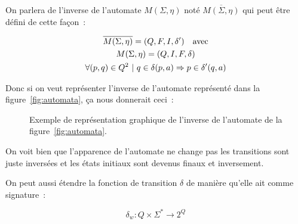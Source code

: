 \documentclass[12pt]{article}
\begin{document}
\vphantom{}

On parlera de l'inverse de l'automate \(M(\Sigma, \eta)\) noté
\(\overline{M(\Sigma, \eta)}\) qui peut être défini de cette façon~:

\begin{gather}
    \overline{M(\Sigma, \eta)} = (Q, F, I, \delta') \quad \text{avec} \\
    M(\Sigma, \eta) = (Q, I, F, \delta) \notag \\
    \forall (p, q) \in Q^2 ~|~ q \in \delta(p, a) \Rightarrow p \in \delta'(q, a) \notag
\end{gather}

Donc si on veut représenter l'inverse de l'automate représenté dans la
figure~\ref{fig:automata}, ça nous donnerait ceci~:

\begin{figure}[H]
    \centering
    \captionsetup{type=figure,justification=centering}
    \caption{
        Exemple de représentation graphique de l'inverse de l'automate de la
        figure~\ref{fig:automata}.
    }\label{fig:automata_invserse}
\end{figure}

On voit bien que l'apparence de l'automate ne change pas les transitions sont
juste inversées et les états initiaux sont devenus finaux et inversement.

\vphantom{}

On peut aussi étendre la fonction de transition \(\delta\) de manière qu'elle
ait comme signature~:

\[
    \delta_w: Q \times \Sigma^* \to 2^Q
\]
\end{document}
